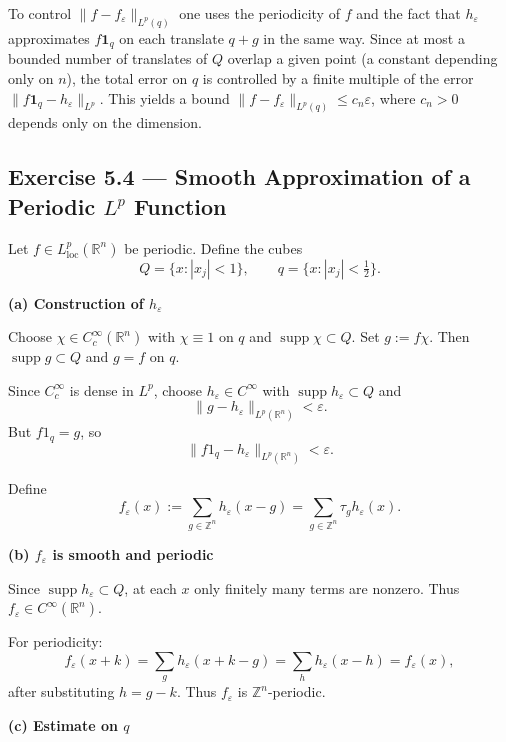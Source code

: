 \documentclass[12pt,a4paper]{article}
\theoremstyle{plain}
\theoremstyle{definition}
\theoremstyle{remark}
\theoremstyle{remark}
\begin{document}
To control $\|f-f_\varepsilon\|_{L^p(q)}$ one uses the periodicity of $f$
and the fact that $h_\varepsilon$ approximates $f\mathbf{1}_q$ on each
translate $q+g$ in the same way.  Since at most a bounded number of
translates of $Q$ overlap a given point (a constant depending only on
$n$), the total error on $q$ is controlled by a finite multiple of the
error $\|f\mathbf{1}_q-h_\varepsilon\|_{L^p}$.  This yields a bound
$\|f - f_\varepsilon\|_{L^p(q)} \le c_n\varepsilon$, where $c_n>0$
depends only on the dimension.


\subsection*{Exercise 5.4 — Smooth Approximation of a Periodic $L^p$ Function}

Let $f\in L^p_{\mathrm{loc}}(\mathbb{R}^n)$ be periodic.  
Define the cubes
\[
Q = \{x : |x_j|<1\}, \qquad q = \{x : |x_j|<\tfrac12\}.
\]

\bigskip
\noindent\textbf{(a) Construction of $h_\varepsilon$}

Choose $\chi\in C_c^\infty(\mathbb{R}^n)$ with  
$\chi\equiv 1$ on $q$ and $\operatorname{supp}\chi \subset Q$.  
Set $g := f\chi$. Then $\operatorname{supp}g \subset Q$ and $g=f$ on $q$.

Since $C_c^\infty$ is dense in $L^p$, choose $h_\varepsilon\in C^\infty$ with  
$\operatorname{supp}h_\varepsilon\subset Q$ and
\[
\|g - h_\varepsilon\|_{L^p(\mathbb{R}^n)} < \varepsilon.
\]
But $f1_q = g$, so
\[
\|f1_q - h_\varepsilon\|_{L^p(\mathbb{R}^n)} < \varepsilon.
\]

\bigskip
Define
\[
f_\varepsilon(x) := \sum_{g\in\mathbb{Z}^n} h_\varepsilon(x-g)
= \sum_{g\in\mathbb{Z}^n} \tau_g h_\varepsilon(x).
\]

\bigskip
\noindent\textbf{(b) $f_\varepsilon$ is smooth and periodic}

Since $\operatorname{supp}h_\varepsilon\subset Q$, at each $x$ only finitely many terms are nonzero.  
Thus $f_\varepsilon\in C^\infty(\mathbb{R}^n)$.

For periodicity:
\[
f_\varepsilon(x+k)
= \sum_{g} h_\varepsilon(x+k-g)
= \sum_{h} h_\varepsilon(x-h)
= f_\varepsilon(x),
\]
after substituting $h=g-k$.  
Thus $f_\varepsilon$ is $\mathbb{Z}^n$-periodic.

\bigskip
\noindent\textbf{(c) Estimate on $q$}
\end{document}
